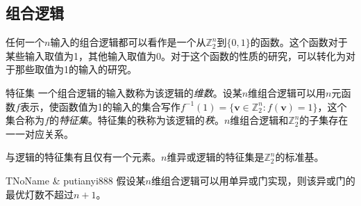 \subsection{组合逻辑}
任何一个$n$输入的组合逻辑都可以看作是一个从$\mathbb{Z}_2^n$到$\{0,1\}$的函数。这个函数对于某些输入取值为1，其他输入取值为0。对于这个函数的性质的研究，可以转化为对于那些取值为1的输入的研究。
\begin{definition}{特征集}{}
  一个组合逻辑的输入数称为该逻辑的\emph{维数}。设某$n$维组合逻辑可以用$n$元函数$f$表示，使函数值为1的输入的集合写作$f^{-1}(1)=\{\mathbf{v}\in\mathbb{Z}_2^n:f(\mathbf{v})=1\}$，这个集合称为$f$的\emph{特征集}。特征集的秩称为该逻辑的\emph{秩}。$n$维组合逻辑和$\mathbb{Z}_2^n$的子集存在一一对应关系。
\end{definition}
\begin{example}{}{}
  与逻辑的特征集有且仅有一个元素。$n$维异或逻辑的特征集是$\mathbb{Z}_2^n$的标准基。
\end{example}
\begin{theorem}{TNoName \& putianyi888}{}
  假设某$n$维组合逻辑可以用单异或门实现，则该异或门的最优灯数不超过$n+1$。
\end{theorem}
